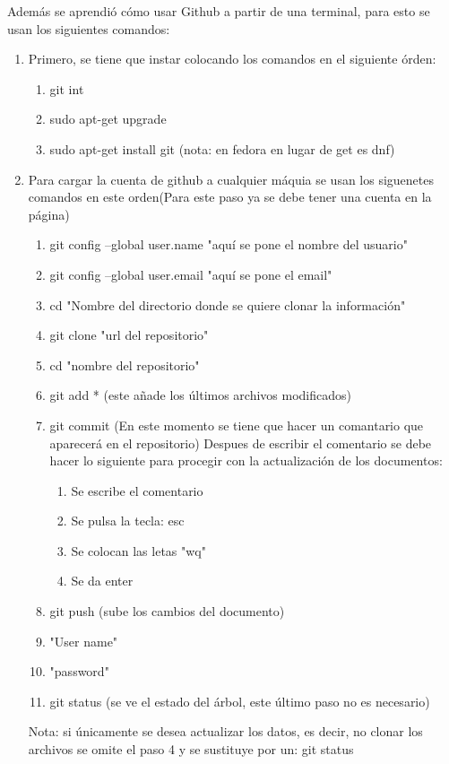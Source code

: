 \documentclass{book}
\begin{document}
	Además se aprendió cómo usar Github a partir de una terminal, para esto se usan los siguientes comandos:
	\begin{enumerate}
		\item 
		Primero, se tiene que instar colocando los comandos en el siguiente órden:
		\begin{enumerate}
			\item 
			git int
			\item 
			sudo apt-get upgrade
			\item 
			sudo apt-get install git (nota: en fedora en lugar de get es dnf)
		\end{enumerate}
		\item 
		Para cargar la cuenta de github a cualquier máquia se usan los siguenetes comandos en este orden(Para este paso ya se debe tener una cuenta en la página)
		\begin{enumerate}
			\item 
			git config --global user.name "aquí se pone el nombre del usuario"
			\item 
			git config --global user.email "aquí se pone el email"
			\item 
			cd "Nombre del directorio donde se quiere clonar la información"
			\item 
			git clone "url del repositorio"
			\item
			cd "nombre del repositorio"
			\item 
			git add * (este añade los últimos archivos modificados)
			\item 
			git commit (En este momento se tiene que hacer un comantario que aparecerá en el repositorio) Despues de escribir el comentario se debe hacer lo siguiente para procegir con la actualización de los documentos:
			\begin{enumerate}
				\item 
				Se escribe el comentario
				\item
				Se pulsa la tecla: esc
				\item
				Se colocan las letas "wq" 
				\item 
				Se da enter
			\end{enumerate}
			\item 
			git push  (sube los cambios del documento)
			\item 
			"User name"
			\item 
			"password"
			\item
			git status (se ve el estado del árbol, este último paso no es necesario)
		\end{enumerate}
		Nota: si únicamente se desea actualizar los datos, es decir, no clonar los archivos se omite el paso 4 y se sustituye por un: git status
	\end{enumerate}
\end{document}
